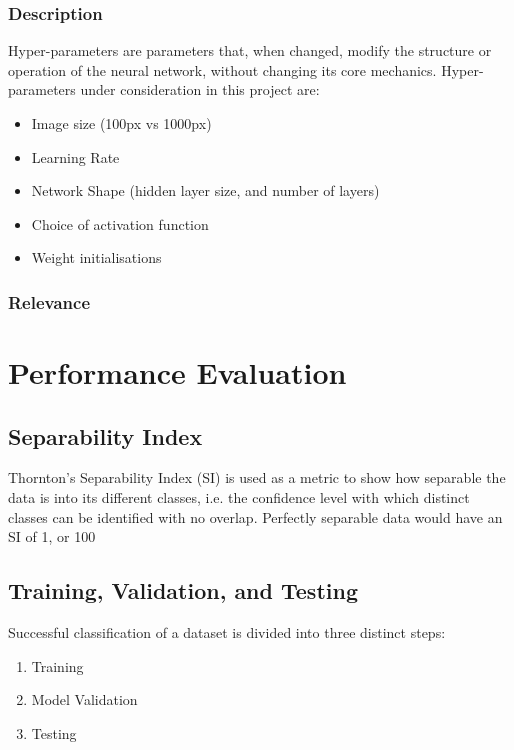 \subsubsection{Description}
Hyper-parameters are parameters that, when changed, modify the structure or operation of the neural network, without changing its core mechanics. Hyper-parameters under consideration in this project are:
\begin{itemize}
	\item Image size (100px vs 1000px)
	\item Learning Rate
	\item Network Shape (hidden layer size, and number of layers)
	\item Choice of activation function
	\item Weight initialisations %
\end{itemize}
\subsubsection{Relevance}


\section{Performance Evaluation}
\subsection{Separability Index}\label{lit:SI}
Thornton's Separability Index (SI) is used as a metric to show how separable the data is into its different classes, i.e. the confidence level with which distinct classes can be identified with no overlap. Perfectly separable data would have an SI of 1, or 100%

\subsection{Training, Validation, and Testing}\label{lit:loocv}
Successful classification of a dataset is divided into three distinct steps:
\begin{enumerate}
	\item Training
	\item Model Validation
	\item Testing
\end{enumerate}

